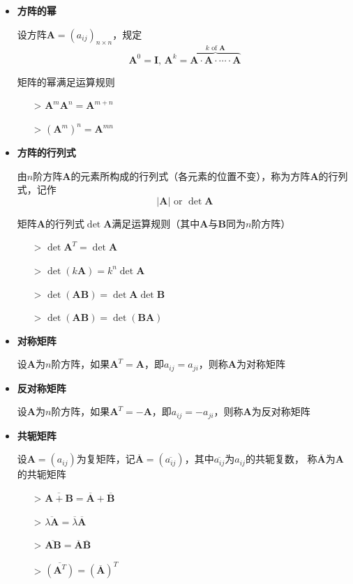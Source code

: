 \documentclass[UTF8]{ctexart}
\newcommand{\ve}[1]{{\bm{#1}}}
\newcommand{\mat}[1]{\ve{#1}}
\newcommand{\abs}[1]{{\left|{#1}\right|}}
\newcommand{\emplin}{\vspace{1em}}
\begin{document}
\begin{itemize}
  \item \textbf{方阵的幂}

  设方阵$\mat{A}=(a_{ij})_{n\times n}$，规定
  \[\mat{A}^0=\mat{I}\text{, }\mat{A}^k=\overbrace{\mat{A}\cdot\mat{A}\cdot\cdots\cdot\mat{A}}^{k\text{ of }\mat{A}}\]

  \emplin

  矩阵的幂满足运算规则
  \begin{itemize}
    \item[>] $\displaystyle \mat{A}^m\mat{A}^n=\mat{A}^{m+n}$
    \item[>] $\displaystyle (\mat{A}^m)^n=\mat{A}^{mn}$
  \end{itemize}

  \item \textbf{方阵的行列式}

  由$n$阶方阵$\mat{A}$的元素所构成的行列式（各元素的位置不变），称为方阵$\mat{A}$的行列式，记作
  \[\abs{\mat{A}}\text{ or }\det\mat{A}\]

  \emplin

  矩阵$\mat{A}$的行列式$\det\mat{A}$满足运算规则（其中$\mat{A}$与$\mat{B}$同为$n$阶方阵）
  \begin{itemize}
    \item[>] $\displaystyle \det\mat{A}^T=\det\mat{A}$
    \item[>] $\displaystyle \det(k\mat{A})=k^n\det\mat{A}$
    \item[>] $\displaystyle \det(\mat{A}\mat{B})=\det\mat{A}\det\mat{B}$
    \item[>] $\displaystyle \det(\mat{A}\mat{B})=\det(\mat{B}\mat{A})$
  \end{itemize}

  \item \textbf{对称矩阵}

  设$\mat{A}$为$n$阶方阵，如果$\mat{A}^T=\mat{A}$，即$a_{ij}=a_{ji}$，则称$\mat{A}$为对称矩阵

  \item \textbf{反对称矩阵}

  设$\mat{A}$为$n$阶方阵，如果$\mat{A}^T=-\mat{A}$，即$a_{ij}=-a_{ji}$，则称$\mat{A}$为反对称矩阵

  \item \textbf{共轭矩阵}

  设$\mat{A}=(a_{ij})$为复矩阵，记$\overline{\mat{A}}=(\overline{a_{ij}})$，其中$\overline{a_{ij}}$为$a_{ij}$的共轭复数，
  称$\overline{\mat{A}}$为$\mat{A}$的共轭矩阵

  \emplin

  \begin{itemize}
    \item[>] $\displaystyle \overline{\mat{A}+\mat{B}}=\overline{\mat{A}}+\overline{\mat{B}}$
    \item[>] $\displaystyle \overline{\lambda\mat{A}}=\overline{\lambda}\overline{\mat{A}}$
    \item[>] $\displaystyle \overline{\mat{A}\mat{B}}=\overline{\mat{A}}\overline{\mat{B}}$
    \item[>] $\displaystyle \overline{(\mat{A}^T)}=(\overline{\mat{A}})^T$
  \end{itemize}
\end{itemize}
\end{document}
